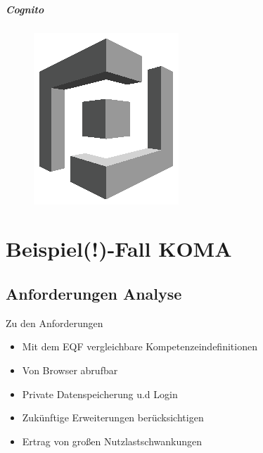 \documentclass[
12pt,
english,
ngerman,
headsepline,
twoside,
openright,
numbers=noenddot,version=first
]{scrreprt}
\begin{document}
\paragraph{Cognito}
\begin{figure}
	\includegraphics[width=0.9\linewidth]{./pics/aws/MobileServices_GRAYSCALE_AmazonCognito.eps}
\end{figure}


\chapter{Beispiel(!)-Fall KOMA}

\section{Anforderungen Analyse}

Zu den Anforderungen
\begin{itemize}
	\item Mit dem EQF vergleichbare Kompetenzeindefinitionen
	\item Von Browser abrufbar
	\item Private Datenspeicherung u.d Login
	\item Zukünftige Erweiterungen berücksichtigen
	\item Ertrag von großen Nutzlastschwankungen
\end{itemize}
\end{document}
